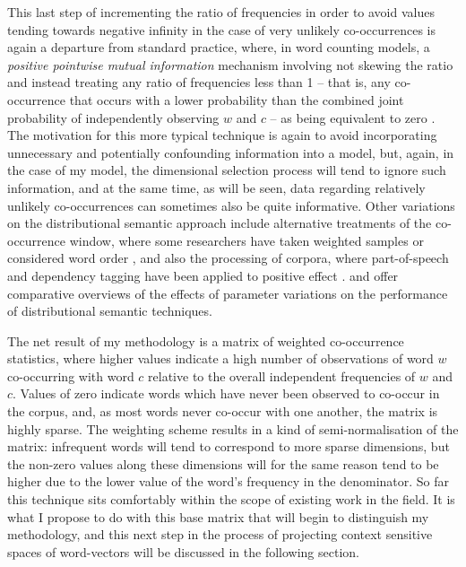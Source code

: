 This last step of incrementing the ratio of frequencies in order to avoid values tending towards negative infinity in the case of very unlikely co-occurrences is again a departure from standard practice, where, in word counting models, a \emph{positive pointwise mutual information} mechanism involving not skewing the ratio and instead treating any ratio of frequencies less than 1 -- that is, any co-occurrence that occurs with a lower probability than the combined joint probability of independently observing $w$ and $c$ -- as being equivalent to zero \citep[][have considered a more general variable ratio shifting parameter]{LevyEA2014b}.  The motivation for this more typical technique is again to avoid incorporating unnecessary and potentially confounding information into a model, but, again, in the case of my model, the dimensional selection process will tend to ignore such information, and at the same time, as will be seen, data regarding relatively unlikely co-occurrences can sometimes also be quite informative.  Other variations on the distributional semantic approach include alternative treatments of the co-occurrence window, where some researchers have taken weighted samples or considered word order \citep{SocherEA2013b}, and also the processing of corpora, where part-of-speech and dependency tagging have been applied to positive effect \citep{PadoEA2007}.  \cite{LapesaEA2014} and \cite{MilajevsEA2016} offer comparative overviews of the effects of parameter variations on the performance of distributional semantic techniques.

The net result of my methodology is a matrix of weighted co-occurrence statistics, where higher values indicate a high number of observations of word $w$ co-occurring with word $c$ relative to the overall independent frequencies of $w$ and $c$.  Values of zero indicate words which have never been observed to co-occur in the corpus, and, as most words never co-occur with one another, the matrix is highly sparse.  The weighting scheme results in a kind of semi-normalisation of the matrix: infrequent words will tend to correspond to more sparse dimensions, but the non-zero values along these dimensions will for the same reason tend to be higher due to the lower value of the word's frequency in the denominator.  So far this technique sits comfortably within the scope of existing work in the field.  It is what I propose to do with this base matrix that will begin to distinguish my methodology, and this next step in the process of projecting context sensitive spaces of word-vectors will be discussed in the following section.

